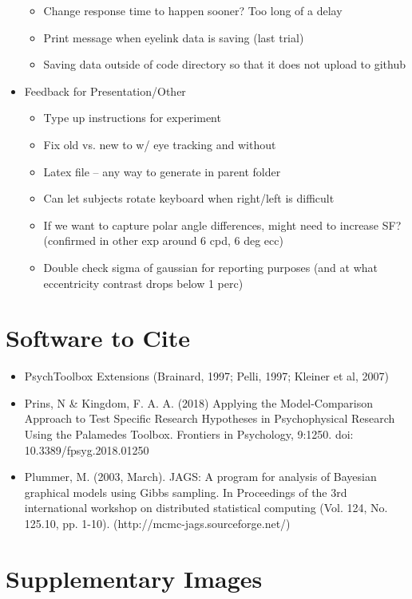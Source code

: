 \documentclass[11pt]{article} %
\begin{document}
\begin{itemize}
\begin{itemize}
	\item Change response time to happen sooner? Too long of a delay
	\item Print message when eyelink data is saving (last trial)
	\item Saving data outside of code directory so that it does not upload to github
	\end{itemize}
\item Feedback for Presentation/Other
	\begin{itemize}
	\item Type up instructions for experiment
	\item Fix old vs. new to w/ eye tracking and without
	\item Latex file -- any way to generate in parent folder
	\item Can let subjects rotate keyboard when right/left is difficult
	\item If we want to capture polar angle differences, might need to increase SF? (confirmed in other exp around 6 cpd, 6 deg ecc)
	\item Double check sigma of gaussian for reporting purposes (and at what eccentricity contrast drops below 1 perc)
	\end{itemize}
\end{itemize}

\section{Software to Cite}
\begin{itemize}
\item PsychToolbox Extensions (Brainard, 1997; Pelli, 1997; Kleiner et al, 2007)
\item Prins, N \& Kingdom, F. A. A. (2018) Applying the Model-Comparison Approach to Test Specific Research Hypotheses in Psychophysical Research Using the Palamedes Toolbox. Frontiers in Psychology, 9:1250. doi: 10.3389/fpsyg.2018.01250
\item Plummer, M. (2003, March). JAGS: A program for analysis of Bayesian graphical models using Gibbs sampling. In Proceedings of the 3rd international workshop on distributed statistical computing (Vol. 124, No. 125.10, pp. 1-10). (http://mcmc-jags.sourceforge.net/)
\end{itemize}

\section{Supplementary Images}
\end{document}
